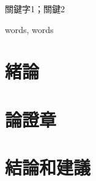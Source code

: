 \documentclass{format/MUSTThesisC}
\begin{document}







\def\Ctitle 		{中文題目}
\def\Etitle 		{英文題目}
\def\Sname 			{Y.J.Li}
\def\Sno 			{1809853G-BM30-0053}
\def\Sfaculty 		{商學院}
\def\Sprogram 		{XXX}
\def\Smajor 		{XXXX}
\def\Ssupervisor	{A/Prof.Jenny}
\def\Sdate			{\today}

\mustTitle



\mustCabstract
{
	
}
{關鍵字1；關鍵2}



\mustEabstract
{
	
}
{words, words}



\mustcontents



\linespread{1.65}\selectfont


\chapter{緒論}

\chapter{論證章}

\chapter{結論和建議}





\bibreference



\MUSTappendix{
	
}
\end{document}

